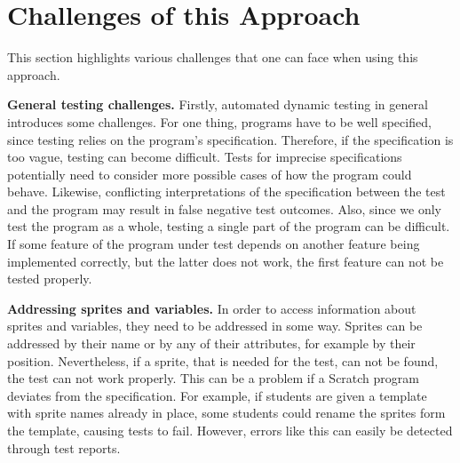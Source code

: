 \section{Challenges of this Approach}
\label{sec:appraoch_challenges}


This section highlights various challenges that one can face when using this approach.%
\parspace

\textbf{General testing challenges.}
Firstly, automated dynamic testing in general introduces some challenges.
For one thing, programs have to be well specified, since testing relies on the program's specification.
Therefore, if the specification is too vague, testing can become difficult.
Tests for imprecise specifications potentially need to consider more possible cases of how the program could behave.
Likewise, conflicting interpretations of the specification between the test and the program may result in false negative test outcomes.
Also, since we only test the program as a whole, testing a single part of the program can be difficult.
If some feature of the program under test depends on another feature being implemented correctly,
but the latter does not work, the first feature can not be tested properly.
\parspace

\textbf{Addressing sprites and variables.}
In order to access information about sprites and variables, they need to be addressed in some way.
Sprites can be addressed by their name or by any of their attributes, for example by their position.
Nevertheless, if a sprite, that is needed for the test, can not be found, the test can not work properly.
This can be a problem if a Scratch program deviates from the specification.
For example, if students are given a template with sprite names already in place,
some students could rename the sprites form the template, causing tests to fail.
However, errors like this can easily be detected through test reports.
\parspace

